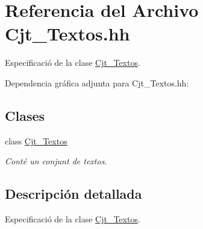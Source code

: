 \hypertarget{_cjt___textos_8hh}{}\section{Referencia del Archivo Cjt\+\_\+\+Textos.\+hh}
\label{_cjt___textos_8hh}


Especificació de la clase \hyperlink{class_cjt___textos}{Cjt\+\_\+\+Textos}.  


Dependencia gráfica adjunta para Cjt\+\_\+\+Textos.\+hh\+:
\subsection*{Clases}
\begin{DoxyCompactItemize}
\item 
class \hyperlink{class_cjt___textos}{Cjt\+\_\+\+Textos}
\begin{DoxyCompactList}\small\item\em Conté un conjunt de textos. \end{DoxyCompactList}\end{DoxyCompactItemize}


\subsection{Descripción detallada}
Especificació de la clase \hyperlink{class_cjt___textos}{Cjt\+\_\+\+Textos}. 

